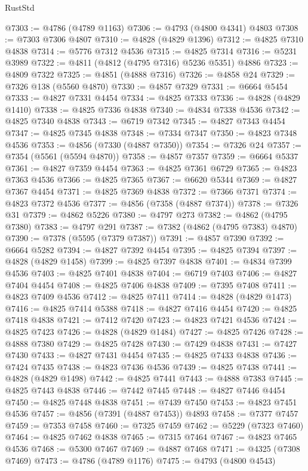 \begin{lexlean}{RustStd}
\begin{coremodule}
@7303 := @4786 (@4789 @1163)
@7306 := @4793 (@4800 @4341) @4803
@7308 := @7303 @7306 @4807
@7310 := @4828 (@4829 @1396)
@7312 := @4825 @7310 @4838
@7314 := @5776 @7312 @4536
@7315 := @4825 @7314
@7316 := @5231 @3989
@7322 := @4811 (@4812 (@4795 @7316) @5236 @5351) @4886
@7323 := @4809 @7322
@7325 := @4851 (@4888 @7316)
@7326 := @4858 @24
@7329 := @7326 @138 (@5560 @4870)
@7330 := @4857 @7329
@7331 := @6664 @5454
@7333 := @4827 @7331 @4454
@7334 := @4825 @7333
@7336 := @4828 (@4829 @1410)
@7338 := @4825 @7336 @4838
@7340 := @4834 @7338 @4536
@7342 := @4825 @7340 @4838
@7343 := @6719 @7342
@7345 := @4827 @7343 @4454
@7347 := @4825 @7345 @4838
@7348 := @7334 @7347
@7350 := @4823 @7348 @4536
@7353 := @4856 (@7330 (@4887 @7350))
@7354 := @7326 @24
@7357 := @7354 (@5561 (@5594 @4870))
@7358 := @4857 @7357
@7359 := @6664 @5337
@7361 := @4827 @7359 @4454
@7363 := @4825 @7361 @6729
@7365 := @4823 @7363 @4536
@7366 := @4825 @7365
@7367 := @6620 @5344
@7369 := @4827 @7367 @4454
@7371 := @4825 @7369 @4838
@7372 := @7366 @7371
@7374 := @4823 @7372 @4536
@7377 := @4856 (@7358 (@4887 @7374))
@7378 := @7326 @31
@7379 := @4862 @5226
@7380 := @4797 @273
@7382 := @4862 (@4795 @7380)
@7383 := @4797 @291
@7387 := @7382 (@4862 (@4795 @7383) @4870)
@7390 := @7378 (@5595 (@7379 @7387))
@7391 := @4857 @7390
@7392 := @6664 @5282
@7394 := @4827 @7392 @4454
@7395 := @4825 @7394
@7397 := @4828 (@4829 @1458)
@7399 := @4825 @7397 @4838
@7401 := @4834 @7399 @4536
@7403 := @4825 @7401 @4838
@7404 := @6719 @7403
@7406 := @4827 @7404 @4454
@7408 := @4825 @7406 @4838
@7409 := @7395 @7408
@7411 := @4823 @7409 @4536
@7412 := @4825 @7411
@7414 := @4828 (@4829 @1473)
@7416 := @4825 @7414 @5388
@7418 := @4827 @7416 @4454
@7420 := @4825 @7418 @4838
@7421 := @7412 @7420
@7423 := @4823 @7421 @4536
@7424 := @4825 @7423
@7426 := @4828 (@4829 @1484)
@7427 := @4825 @7426
@7428 := @4888 @7380
@7429 := @4825 @7428
@7430 := @7429 @4838
@7431 := @7427 @7430
@7433 := @4827 @7431 @4454
@7435 := @4825 @7433 @4838
@7436 := @7424 @7435
@7438 := @4823 @7436 @4536
@7439 := @4825 @7438
@7441 := @4828 (@4829 @1498)
@7442 := @4825 @7441
@7443 := @4888 @7383
@7445 := @4825 @7443 @4838
@7446 := @7442 @7445
@7448 := @4827 @7446 @4454
@7450 := @4825 @7448 @4838
@7451 := @7439 @7450
@7453 := @4823 @7451 @4536
@7457 := @4856 (@7391 (@4887 @7453)) @4893
@7458 := @7377 @7457
@7459 := @7353 @7458
@7460 := @7325 @7459
@7462 := @5229 (@7323 @7460)
@7464 := @4825 @7462 @4838
@7465 := @7315 @7464
@7467 := @4823 @7465 @4536
@7468 := @5300 @7467
@7469 := @4887 @7468
@7471 := @4325 (@7308 @7469)
@7473 := @4786 (@4789 @1176)
@7475 := @4793 (@4800 @4543)

\end{coremodule}
\end{lexlean}
